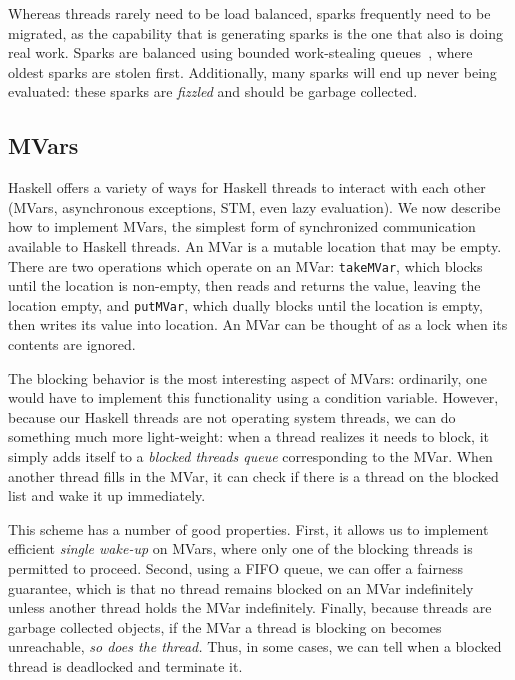 Whereas threads rarely need to be load balanced, sparks frequently need
to be migrated, as the capability that is generating
sparks is the one that also is doing real work.  Sparks are balanced using
bounded work-stealing queues~\XXX, where oldest sparks are stolen first.
Additionally, many sparks will end up never being evaluated: these sparks
are \emph{fizzled} and should be garbage collected. 

\subsection{MVars}

Haskell offers a variety of ways for Haskell threads to interact with
each other (MVars, asynchronous exceptions, STM, even lazy evaluation).
We now describe how to implement MVars, the simplest form of
synchronized communication available to Haskell threads.  An MVar is a mutable
location that may be empty.  There are two operations which operate on
an MVar: \verb|takeMVar|, which blocks until the location is non-empty,
then reads and returns the value, leaving the location empty, and
\verb|putMVar|, which dually blocks until the location is empty, then
writes its value into location.  An MVar can be thought of as a lock when
its contents are ignored.

The blocking behavior is the most interesting aspect of MVars:
ordinarily, one would have to implement this functionality using a
condition variable.  However, because our Haskell threads are not
operating system threads, we can do something much more light-weight:
when a thread realizes it needs to block, it simply adds itself to a
\emph{blocked threads queue} corresponding to the MVar.  When another
thread fills in the MVar, it can check if there is a thread on the
blocked list and wake it up immediately.

This scheme has a number of good properties.  First, it allows us
to implement efficient \emph{single wake-up} on MVars, where only one of
the blocking threads is permitted to proceed. Second, using a FIFO
queue, we can offer a fairness guarantee, which is that no thread
remains blocked on an MVar indefinitely unless another thread holds the
MVar indefinitely.  Finally, because threads are garbage collected
objects, if the MVar a thread is blocking on becomes unreachable,
\emph{so does the thread.}  Thus, in some cases, we can tell when
a blocked thread is deadlocked and terminate it.


